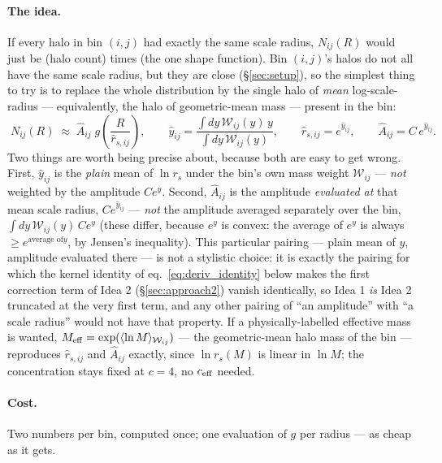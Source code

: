 \documentclass[a4paper, 11pt]{article}
\newcommand{\lnM}{\ln M}
\newcommand{\rs}{r_s}
\newcommand{\reffi}[1]{\hat r_{s,#1}}
\newcommand{\yeff}{\hat y}
\newcommand{\Aeff}{\hat A}
\newcommand{\Wcal}{\mathcal{W}}
\begin{document}
\paragraph{The idea.} If every halo in bin $(i,j)$ had exactly the
same scale radius, $N_{ij}(R)$ would just be (halo count) times
(the one shape function). Bin $(i,j)$'s halos do not all have the
same scale radius, but they are close (\S\ref{sec:setup}), so the
simplest thing to try is to replace the whole distribution by the
single halo of \emph{mean} log-scale-radius --- equivalently, the
halo of geometric-mean mass --- present in the bin:
\begin{equation}
\boxed{\;
N_{ij}(R) \;\approx\; \Aeff_{ij}\; g\!\left(\frac{R}{\reffi{ij}}\right),
\qquad
\yeff_{ij} = \frac{\int dy\,\Wcal_{ij}(y)\, y}{\int dy\,\Wcal_{ij}(y)},
\qquad
\reffi{ij} = e^{\yeff_{ij}},
\qquad
\Aeff_{ij} = C\, e^{\yeff_{ij}}.
\;}
\label{eq:approach1}
\end{equation}
Two things are worth being precise about, because both are easy to
get wrong. First, $\yeff_{ij}$ is the \emph{plain} mean of $\ln\rs$
under the bin's own mass weight $\Wcal_{ij}$ --- \emph{not} weighted
by the amplitude $Ce^y$. Second, $\Aeff_{ij}$ is the amplitude
\emph{evaluated at} that mean scale radius, $Ce^{\yeff_{ij}}$ ---
\emph{not} the amplitude averaged separately over the bin,
$\int dy\,\Wcal_{ij}(y)\,Ce^y$ (these differ, because $e^y$ is
convex: the average of $e^y$ is always $\ge e^{\text{average of
}y}$, by Jensen's inequality). This particular pairing --- plain
mean of $y$, amplitude evaluated there --- is not a stylistic
choice: it is exactly the pairing for which the kernel identity of
eq.~\eqref{eq:deriv_identity} below makes the first correction term
of Idea 2 (\S\ref{sec:approach2}) vanish identically, so Idea 1
\emph{is} Idea 2 truncated at the very first term, and any other
pairing of ``an amplitude'' with ``a scale radius'' would not have
that property. If a physically-labelled effective mass is wanted,
$M_{\rm eff}=\exp(\langle\lnM\rangle_{\Wcal_{ij}})$ --- the
geometric-mean halo mass of the bin --- reproduces $\reffi{ij}$ and
$\Aeff_{ij}$ exactly, since $\ln\rs(M)$ is linear in $\lnM$; the
concentration stays fixed at $c=4$, no $c_{\rm eff}$ needed.

\paragraph{Cost.} Two numbers per bin, computed once; one
evaluation of $g$ per radius --- as cheap as it gets.
\end{document}
